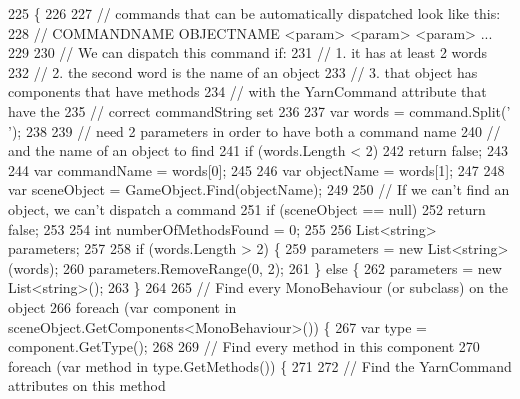 \begin{DoxyCode}
225                                                     \{
226 
227             \textcolor{comment}{// commands that can be automatically dispatched look like this:}
228             \textcolor{comment}{// COMMANDNAME OBJECTNAME <param> <param> <param> ...}
229 
230             \textcolor{comment}{// We can dispatch this command if:}
231             \textcolor{comment}{// 1. it has at least 2 words}
232             \textcolor{comment}{// 2. the second word is the name of an object}
233             \textcolor{comment}{// 3. that object has components that have methods }
234             \textcolor{comment}{//    with the YarnCommand attribute that have the}
235             \textcolor{comment}{//    correct commandString set}
236 
237             var words = command.Split(\textcolor{charliteral}{' '});
238 
239             \textcolor{comment}{// need 2 parameters in order to have both a command name}
240             \textcolor{comment}{// and the name of an object to find}
241             \textcolor{keywordflow}{if} (words.Length < 2)
242                 \textcolor{keywordflow}{return} \textcolor{keyword}{false};
243 
244             var commandName = words[0];
245 
246             var objectName = words[1];
247 
248             var sceneObject = GameObject.Find(objectName);
249 
250             \textcolor{comment}{// If we can't find an object, we can't dispatch a command}
251             \textcolor{keywordflow}{if} (sceneObject == null)
252                 \textcolor{keywordflow}{return} \textcolor{keyword}{false};
253 
254             \textcolor{keywordtype}{int} numberOfMethodsFound = 0;
255 
256             List<string> parameters;
257 
258             \textcolor{keywordflow}{if} (words.Length > 2) \{
259                 parameters = \textcolor{keyword}{new} List<string>(words);
260                 parameters.RemoveRange(0, 2);
261             \} \textcolor{keywordflow}{else} \{
262                 parameters = \textcolor{keyword}{new} List<string>();
263             \}
264 
265             \textcolor{comment}{// Find every MonoBehaviour (or subclass) on the object}
266             \textcolor{keywordflow}{foreach} (var component \textcolor{keywordflow}{in} sceneObject.GetComponents<MonoBehaviour>()) \{
267                 var type = component.GetType();
268 
269                 \textcolor{comment}{// Find every method in this component}
270                 \textcolor{keywordflow}{foreach} (var method \textcolor{keywordflow}{in} type.GetMethods()) \{
271 
272                     \textcolor{comment}{// Find the YarnCommand attributes on this method}

\end{DoxyCode}
